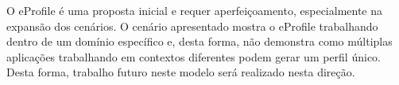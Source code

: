 \documentclass[times, 10pt, twocolumn]{article}
\begin{document}
O eProfile é uma proposta inicial e requer aperfeiçoamento, especialmente na expansão dos cenários. O cenário apresentado mostra o eProfile trabalhando dentro de um domínio específico e, desta forma, não demonstra como múltiplas aplicações trabalhando em contextos diferentes podem gerar um perfil único. Desta forma, trabalho futuro neste modelo será realizado nesta direção.



\end{document}
